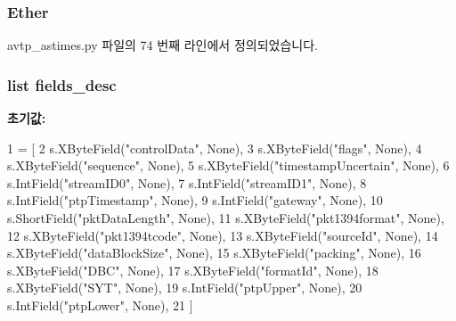 \subsubsection[{\texorpdfstring{Ether}{Ether}}]{\setlength{\rightskip}{0pt plus 5cm}Ether\hspace{0.3cm}{\ttfamily [static]}}\hypertarget{classavtp__astimes_1_1_a_v_t_p_afa5e858f45c827c0008d672a6c84292f}{}\label{classavtp__astimes_1_1_a_v_t_p_afa5e858f45c827c0008d672a6c84292f}


avtp\+\_\+astimes.\+py 파일의 74 번째 라인에서 정의되었습니다.

\subsubsection[{\texorpdfstring{fields\+\_\+desc}{fields_desc}}]{\setlength{\rightskip}{0pt plus 5cm}list fields\+\_\+desc\hspace{0.3cm}{\ttfamily [static]}}\hypertarget{classavtp__astimes_1_1_a_v_t_p_ae9f6e6e337ffed950ec570abe47e4057}{}\label{classavtp__astimes_1_1_a_v_t_p_ae9f6e6e337ffed950ec570abe47e4057}
{\bfseries 초기값\+:}
\begin{DoxyCode}
1 = [
2         s.XByteField(\textcolor{stringliteral}{"controlData"}, \textcolor{keywordtype}{None}),
3         s.XByteField(\textcolor{stringliteral}{"flags"}, \textcolor{keywordtype}{None}),
4         s.XByteField(\textcolor{stringliteral}{"sequence"}, \textcolor{keywordtype}{None}),
5         s.XByteField(\textcolor{stringliteral}{"timestampUncertain"}, \textcolor{keywordtype}{None}),
6         s.IntField(\textcolor{stringliteral}{"streamID0"}, \textcolor{keywordtype}{None}),
7         s.IntField(\textcolor{stringliteral}{"streamID1"}, \textcolor{keywordtype}{None}),
8         s.IntField(\textcolor{stringliteral}{"ptpTimestamp"}, \textcolor{keywordtype}{None}),
9         s.IntField(\textcolor{stringliteral}{"gateway"}, \textcolor{keywordtype}{None}),
10         s.ShortField(\textcolor{stringliteral}{"pktDataLength"}, \textcolor{keywordtype}{None}),
11         s.XByteField(\textcolor{stringliteral}{"pkt1394format"}, \textcolor{keywordtype}{None}),
12         s.XByteField(\textcolor{stringliteral}{"pkt1394tcode"}, \textcolor{keywordtype}{None}),
13         s.XByteField(\textcolor{stringliteral}{"sourceId"}, \textcolor{keywordtype}{None}),
14         s.XByteField(\textcolor{stringliteral}{"dataBlockSize"}, \textcolor{keywordtype}{None}),
15         s.XByteField(\textcolor{stringliteral}{"packing"}, \textcolor{keywordtype}{None}),
16         s.XByteField(\textcolor{stringliteral}{"DBC"}, \textcolor{keywordtype}{None}),
17         s.XByteField(\textcolor{stringliteral}{"formatId"}, \textcolor{keywordtype}{None}),
18         s.XByteField(\textcolor{stringliteral}{"SYT"}, \textcolor{keywordtype}{None}),
19         s.IntField(\textcolor{stringliteral}{"ptpUpper"}, \textcolor{keywordtype}{None}),
20         s.IntField(\textcolor{stringliteral}{"ptpLower"}, \textcolor{keywordtype}{None}),
21     ]
\end{DoxyCode}


